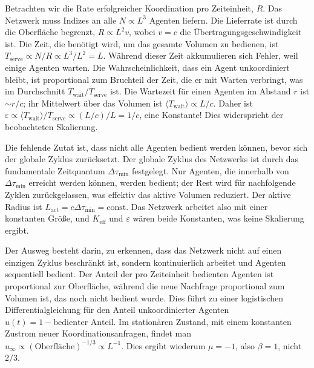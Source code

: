 \documentclass[11pt,a4paper]{article}
\begin{document}
	Betrachten wir die Rate erfolgreicher Koordination pro Zeiteinheit, \(R\). Das Netzwerk muss Indizes an alle \(N \propto L^3\) Agenten liefern. Die Lieferrate ist durch die Oberfläche begrenzt, \(R \propto L^2 v\), wobei \(v = c\) die Übertragungsgeschwindigkeit ist. Die Zeit, die benötigt wird, um das gesamte Volumen zu bedienen, ist \(T_{\mathrm{serve}} \propto N/R \propto L^3/L^2 = L\). Während dieser Zeit akkumulieren sich Fehler, weil einige Agenten warten. Die Wahrscheinlichkeit, dass ein Agent unkoordiniert bleibt, ist proportional zum Bruchteil der Zeit, die er mit Warten verbringt, was im Durchschnitt \(T_{\mathrm{wait}}/T_{\mathrm{serve}}\) ist. Die Wartezeit für einen Agenten im Abstand \(r\) ist \(\sim r/c\); ihr Mittelwert über das Volumen ist \(\langle T_{\mathrm{wait}} \rangle \propto L/c\). Daher ist \(\varepsilon \propto \langle T_{\mathrm{wait}} \rangle/T_{\mathrm{serve}} \propto (L/c)/L = 1/c\), eine Konstante! Dies widerspricht der beobachteten Skalierung.
	
	Die fehlende Zutat ist, dass nicht alle Agenten bedient werden können, bevor sich der globale Zyklus zurücksetzt. Der globale Zyklus des Netzwerks ist durch das fundamentale Zeitquantum \(\Delta\tau_{\min}\) festgelegt. Nur Agenten, die innerhalb von \(\Delta\tau_{\min}\) erreicht werden können, werden bedient; der Rest wird für nachfolgende Zyklen zurückgelassen, was effektiv das aktive Volumen reduziert. Der aktive Radius ist \(L_{\mathrm{act}} = c\Delta\tau_{\min} = \text{const}\). Das Netzwerk arbeitet also mit einer konstanten Größe, und \(K_{\mathrm{eff}}\) und \(\varepsilon\) wären beide Konstanten, was keine Skalierung ergibt.
	
	Der Ausweg besteht darin, zu erkennen, dass das Netzwerk nicht auf einen einzigen Zyklus beschränkt ist, sondern kontinuierlich arbeitet und Agenten sequentiell bedient. Der Anteil der pro Zeiteinheit bedienten Agenten ist proportional zur Oberfläche, während die neue Nachfrage proportional zum Volumen ist, das noch nicht bedient wurde. Dies führt zu einer logistischen Differentialgleichung für den Anteil unkoordinierter Agenten \(u(t) = 1 - \text{bedienter Anteil}\). Im stationären Zustand, mit einem konstanten Zustrom neuer Koordinationsanfragen, findet man \(u_{\infty} \propto (\text{Oberfläche})^{-1/3} \propto L^{-1}\). Dies ergibt wiederum \(\mu = -1\), also \(\beta = 1\), nicht \(2/3\).
	
\end{document}
